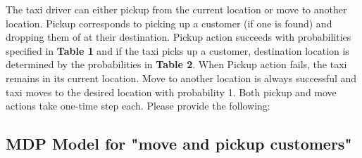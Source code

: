 \documentclass[12pt, letterpaper]{article}
\newcommand{\mybox}[1]{\par\noindent\colorbox{shadecolor}
{\parbox{\dimexpr\textwidth-2\fboxsep\relax}{#1}}}
\begin{document}
\mybox{The taxi driver can either pickup from the current location or move to another location. 
Pickup corresponds to picking up a customer (if one is found) and dropping them of at their destination. 
Pickup action succeeds with probabilities specified in \textbf{Table 1} and if the taxi picks up a customer, destination location is determined by the probabilities in \textbf{Table 2}. 
When Pickup action fails, the taxi remains in its current location. 
Move to another location is always successful and taxi moves to the desired location with probability 1.
Both pickup and move actions take one-time step each. Please provide the following:}

\subsection{MDP Model for "move and pickup customers"}
\end{document}
